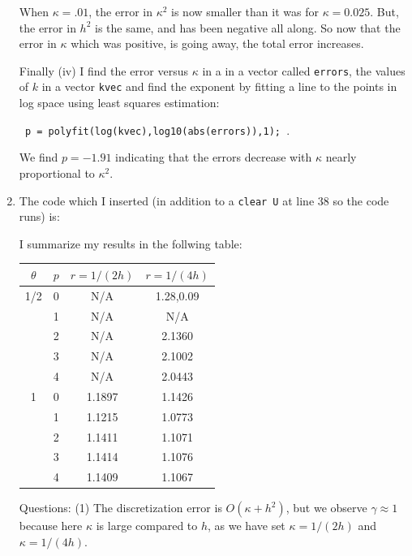 \documentclass[11pt]{article}
\begin{document}
\begin{enumerate}
When $\kappa = .01$, the error in $\kappa^2$ is now smaller than it was for $\kappa = 0.025$. But, the error in $h^2$ is the same, and has been negative all along. So now that the error in $\kappa$ which was positive, is going away, the total error increases.

Finally (iv) I find the error versus $\kappa$ in a in a vector called \verb|errors|, the values of $k$ in a vector \verb|kvec| and find the exponent by fitting a line to the points in log space using least squares estimation: 

\verb| p = polyfit(log(kvec),log10(abs(errors)),1); |.

We find $p = -1.91$ indicating that the errors decrease with $\kappa$ nearly proportional to $\kappa ^2$.

\item The code which I inserted (in addition to a \verb|clear U| at line 38 so the code runs) is:



I summarize my results in the follwing table:
\begin{table}[h]
  \begin{center}
    \begin{tabular}{cccc}
      \hline
$\theta$ & $p$ & $r = 1/(2h)$ & $r=1/(4h)$ \\
      \hline
      \hline
1/2 & 0  & N/A & 1.28,0.09  \\
     &  1  & N/A & N/A  \\
     &  2  & N/A & 2.1360 \\
     &  3  & N/A & 2.1002 \\
     &  4  & N/A & 2.0443 \\
1 & 0  & 1.1897 & 1.1426  \\
     &  1  & 1.1215 & 1.0773  \\
     &  2  & 1.1411 & 1.1071 \\
     &  3  & 1.1414 & 1.1076 \\
     &  4  & 1.1409 & 1.1067 \\
      \hline
    \end{tabular}
  \end{center}
\end{table}

Questions: (1) The discretization error is $O(\kappa + h^2 )$, but we observe $\gamma \approx 1$ because here $\kappa$ is large compared to $h$, as we have set $\kappa = 1/(2h)$ and $\kappa = 1/(4h)$.


\end{enumerate}
\end{document}
